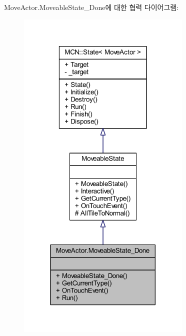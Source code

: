 Move\+Actor.\+Moveable\+State\+\_\+\+Done에 대한 협력 다이어그램\+:\nopagebreak
\begin{figure}[H]
\begin{center}
\leavevmode
\includegraphics[width=237pt]{class_move_actor_1_1_moveable_state___done__coll__graph}
\end{center}
\end{figure}
